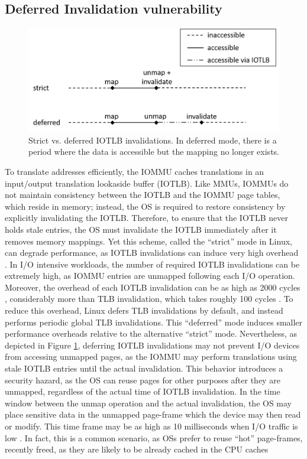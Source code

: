 \subsection{Deferred Invalidation vulnerability} 
\begin{figure}[t]
    \centering
    \includegraphics[width=1\columnwidth]{figs/deferred.png}
    \caption{Strict vs. deferred IOTLB invalidations. In deferred mode, there is a period
where the data is accessible but the mapping no longer exists.}
    \label{fig:deferred}
\end{figure}
To translate addresses efficiently, the IOMMU caches translations in an input/output translation lookaside buffer (IOTLB). Like MMUs, IOMMUs do not maintain consistency between the IOTLB and the IOMMU page tables, which reside in memory; instead, the OS is required to restore consistency by explicitly invalidating the IOTLB. Therefore, to ensure that the IOTLB never holds stale entries, the OS must invalidate the IOTLB immediately after it removes memory mappings. Yet this scheme, called the “strict” mode in Linux, can degrade performance, as IOTLB invalidations can induce very high overhead \cite{MMT16,MSMT18,Peleg15}. In I/O intensive workloads, the number of required IOTLB invalidations can be extremely high, as IOMMU entries are unmapped following each I/O operation. Moreover, the overhead of each IOTLB invalidation can be as high as 2000 cycles \cite{ABYTS11}, considerably more than TLB invalidation, which takes roughly 100 cycles \cite{Han14}. To reduce this overhead, Linux defers TLB invalidations by default, and instead performs periodic global TLB invalidations. This “deferred” mode induces smaller performance overheads relative to the alternative “strict” mode. Nevertheless, as depicted in Figure \ref{fig:deferred}, deferring IOTLB invalidations may not prevent I/O devices from accessing unmapped pages, as the IOMMU may perform translations using stale IOTLB entries until the actual invalidation. This behavior introduces a security hazard, as the OS can reuse pages for other purposes after they are unmapped, regardless of the actual time of IOTLB invalidation. In the time window between the unmap operation and the actual invalidation, the OS may place sensitive data in the unmapped page-frame which the device may then read or modify. This time frame may be as high as 10 milliseconds when I/O traffic is low \cite{MSMT18}. In fact, this is a common scenario, as OSs prefer to reuse “hot” page-frames, recently freed, as they are likely to be already cached in the CPU caches\cite{hotcold}
